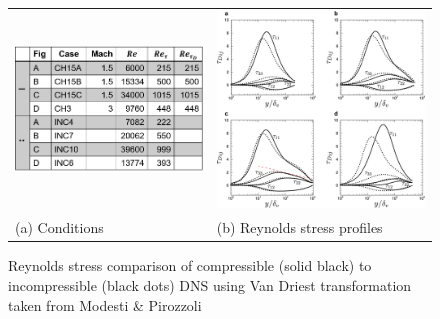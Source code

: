 \begin{figure}[ht]
  \centering
  \setlength{\abovecaptionskip}{20pt}

  \begin{tabular}{
    >{\centering\arraybackslash}m{}  @{\quad}
    >{\centering\arraybackslash}m{}
    }
    \includegraphics[width=\linewidth]{images/van-driest-reynolds-table.png}
     &
    \includegraphics[width=\linewidth]{images/van-driest-incomp-compare2.png}
    \\[1ex]
    (a) Conditions
     &
    (b) Reynolds stress profiles
  \end{tabular}

  \caption{\label{fig:r-vd}
    Reynolds stress comparison of compressible (solid black) to incompressible (black dots) DNS using Van Driest transformation taken from Modesti \& Pirozzoli \cite{modestiReynoldsMachNumber2016}}
\end{figure}
